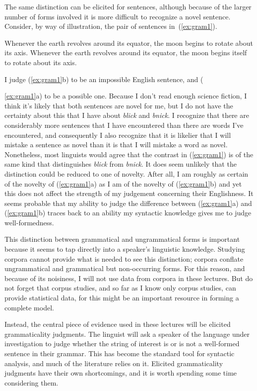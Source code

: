 The same distinction can be elicited for sentences, although because of the larger number of forms involved it is more difficult to recognize a novel sentence. Consider, by way of illustration, the pair of sentences in~(\ref{ex:gram1}).%
\begin{exe}
\ex \label{ex:gram1} 
\begin{xlist}
	\ex Whenever the earth revolves around its equator, the moon begins to rotate about its axis.
	\ex Whenever the earth revolves around its equator, the moon begins itself to rotate about its axis.
\end{xlist}
\end{exe}
I judge (\ref{ex:gram1}b) to be an impossible English sentence, and ({\ref{ex:gram1}a) to be a possible one. Because I don't read enough science fiction, I think it's likely that both sentences are novel for me, but I do not have the certainty about this that I have about \emph{blick} and \emph{bnick}. I recognize that there are considerably more sentences that I have encountered than there are words I've encountered, and consequently I also recognize that it is likelier that I will mistake a sentence as novel than it is that I will mistake a word as novel. Nonetheless, most linguists would agree that the contrast in (\ref{ex:gram1}) is of the same kind that distinguishes \emph{blick} from \emph{bnick}. It does seem unlikely that the distinction could be reduced to one of novelty. After all, I am roughly as certain of the novelty of (\ref{ex:gram1}a) as I am of the novelty of (\ref{ex:gram1}b) and yet this does not affect the strength of my judgement concerning their Englishness. It seems probable that my ability to judge the difference between (\ref{ex:gram1}a) and (\ref{ex:gram1}b) traces back to an ability my syntactic knowledge gives me to judge well-formedness.

This distinction between grammatical and ungrammatical forms is important because it seems to tap directly into a speaker's linguistic knowledge. Studying corpora cannot provide what is needed to see this distinction; corpora conflate ungrammatical and grammatical but non-occurring forms. For this reason, and because of its noisiness, I will not use data from corpora in these lectures. But do not forget that corpus studies, and so far as I know only corpus studies, can provide statistical data, for this might be an important resource in forming a complete model.

Instead, the central piece of evidence used in these lectures will be elicited grammaticality judgments. The linguist will ask a speaker of the language under investigation to judge whether the string of interest is or is not a well-formed sentence in their grammar.  This has become the standard tool for syntactic analysis, and much of the literature relies on it. Elicited grammaticality judgments have their own shortcomings, and it is worth spending some time considering them.

}
